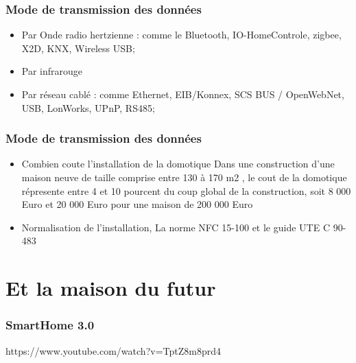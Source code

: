 \documentclass[handout]{beamer}
\begin{document}
\begin{frame}\frametitle{Mode de transmission des données} 
\begin{itemize}
\item Par Onde radio hertzienne : comme le Bluetooth, IO-HomeControle, zigbee, X2D, KNX, Wireless USB;
\item Par infrarouge
\item Par réseau cablé : comme Ethernet, EIB/Konnex, SCS BUS / OpenWebNet, USB, LonWorks, UPnP, RS485;
\end{itemize}
\end{frame}

\begin{frame}\frametitle{Mode de transmission des données} 
\begin{itemize}
\item Combien coute l'installation de la domotique
\linebreak
Dans une construction d’une maison neuve de taille comprise entre 130 à 170 m2 , le cout de la domotique répresente entre 4 et 10 pourcent du coup global de la construction, soit 8 000 Euro et 20 000 Euro pour une maison de 200 000 Euro
\linebreak
\item Normalisation de l'installation, La norme NFC 15-100 et le guide UTE C 90-483
\end{itemize}
\end{frame}

\section{Et la maison du futur}
\begin{frame}\frametitle{SmartHome 3.0} 
 https://www.youtube.com/watch?v=TptZ8m8prd4
\begin{figure}
    \centering
\end{figure}
\end{frame}
\end{document}
